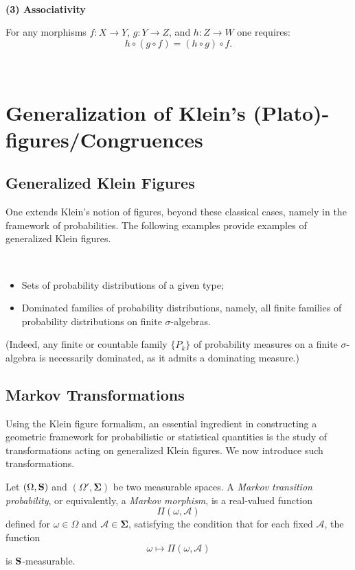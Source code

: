 \, 

{\bf (3) Associativity}

For any morphisms $f:X\to Y$, $g:Y\to Z$, and $h:Z\to W$
one requires:
\[h\circ(g\circ f)=(h\circ g)\circ f.\]


\, 

\section{Generalization of Klein's (Plato)-figures/Congruences}

\subsection{Generalized Klein Figures}
One extends Klein’s notion of figures, beyond these classical cases, namely in the framework of probabilities. 
The following examples provide examples of  generalized Klein figures.

\, 
    \begin{itemize}
        \item Sets of probability distributions of a given type;  
        \item Dominated families of probability distributions, namely, all finite families of probability distributions on finite $\sigma$-algebras.  
    \end{itemize}
(Indeed, any finite or countable family $\{P_k\}$ of probability measures on a finite $\sigma$-algebra is necessarily dominated, as it admits a dominating measure.)




\subsection{Markov Transformations}

Using the Klein figure formalism, an essential ingredient in constructing a geometric framework for probabilistic or statistical quantities is the study of transformations acting on generalized Klein figures. We now introduce such transformations.

\begin{definition}
    Let $(\Omega, \mathbf{S})$ and $(\Omega', \mathbf{\Sigma})$ be two measurable spaces. A \textit{Markov transition probability}, or equivalently, a \textit{Markov morphism}, is a real-valued function \[\Pi(\omega, \mathcal{A})\] defined for $\omega \in \Omega$ and $\mathcal{A} \in \mathbf{\Sigma}$, satisfying the condition that for each fixed $\mathcal{A}$, the function \[\omega \mapsto \Pi(\omega, \mathcal{A})\] is $\mathbf{S}$-measurable.  
\end{definition}

